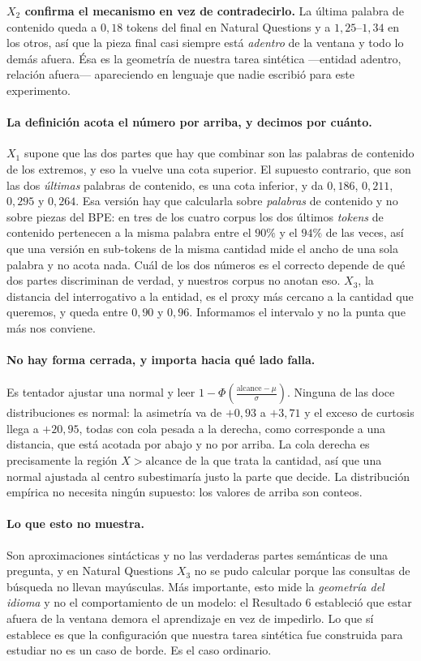\documentclass[11pt,a4paper]{article}
\begin{document}
\textbf{$X_2$ confirma el mecanismo en vez de contradecirlo.} La última palabra de contenido queda a
$0{,}18$ tokens del final en Natural Questions y a $1{,}25$--$1{,}34$ en los otros, así que la pieza
final casi siempre está \emph{adentro} de la ventana y todo lo demás afuera. Ésa es la geometría de
nuestra tarea sintética ---entidad adentro, relación afuera--- apareciendo en lenguaje que nadie
escribió para este experimento.

\paragraph{La definición acota el número por arriba, y decimos por cuánto.} $X_1$ supone que las dos
partes que hay que combinar son las palabras de contenido de los extremos, y eso la vuelve una cota
superior. El supuesto contrario, que son las dos \emph{últimas} palabras de contenido, es una cota
inferior, y da $0{,}186$, $0{,}211$, $0{,}295$ y $0{,}264$. Esa versión hay que calcularla sobre
\emph{palabras} de contenido y no sobre piezas del BPE: en tres de los cuatro corpus los dos últimos
\emph{tokens} de contenido pertenecen a la misma palabra entre el $90\%$ y el $94\%$ de las veces, así
que una versión en sub-tokens de la misma cantidad mide el ancho de una sola palabra y no acota nada.
Cuál de los dos números es el correcto depende de qué dos partes discriminan de verdad, y nuestros
corpus no anotan eso. $X_3$, la distancia del interrogativo a la entidad, es el proxy más cercano a la
cantidad que queremos, y queda entre $0{,}90$ y $0{,}96$. Informamos el intervalo y no la punta que
más nos conviene.

\paragraph{No hay forma cerrada, y importa hacia qué lado falla.} Es tentador ajustar una normal y
leer $1 - \Phi\!\left(\frac{\text{alcance}-\mu}{\sigma}\right)$. Ninguna de las doce distribuciones es
normal: la asimetría va de $+0{,}93$ a $+3{,}71$ y el exceso de curtosis llega a $+20{,}95$, todas con
cola pesada a la derecha, como corresponde a una distancia, que está acotada por abajo y no por
arriba. La cola derecha es precisamente la región $X > \text{alcance}$ de la que trata la cantidad, así
que una normal ajustada al centro subestimaría justo la parte que decide. La distribución empírica no
necesita ningún supuesto: los valores de arriba son conteos.

\paragraph{Lo que esto no muestra.} Son aproximaciones sintácticas y no las verdaderas partes
semánticas de una pregunta, y en Natural Questions $X_3$ no se pudo calcular porque las consultas de
búsqueda no llevan mayúsculas. Más importante, esto mide la \emph{geometría del idioma} y no el
comportamiento de un modelo: el Resultado 6 estableció que estar afuera de la ventana demora el
aprendizaje en vez de impedirlo. Lo que sí establece es que la configuración que nuestra tarea
sintética fue construida para estudiar no es un caso de borde. Es el caso ordinario.
\end{document}

